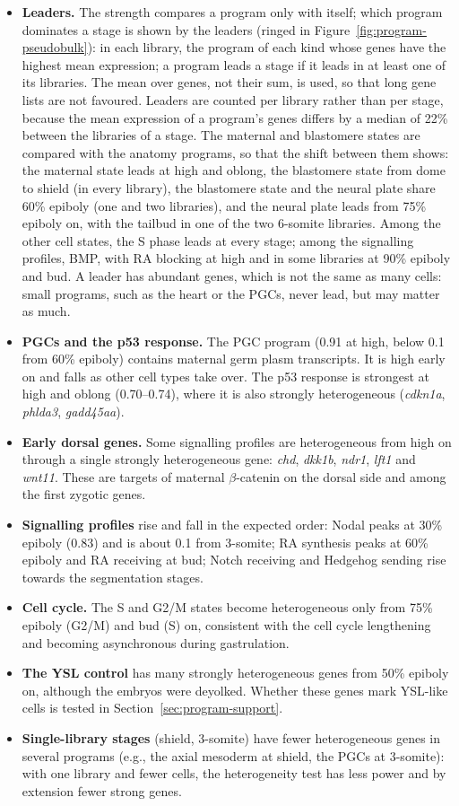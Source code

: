 \documentclass[11pt,a4paper]{article}
\begin{document}
\begin{itemize}
	\item \textbf{Leaders.} The strength compares a program only with itself; which program dominates a stage is shown by the leaders (ringed in Figure~\ref{fig:program-pseudobulk}): in each library, the program of each kind whose genes have the highest mean expression; a program leads a stage if it leads in at least one of its libraries. The mean over genes, not their sum, is used, so that long gene lists are not favoured. Leaders are counted per library rather than per stage, because the mean expression of a program's genes differs by a median of 22\% between the libraries of a stage. The maternal and blastomere states are compared with the anatomy programs, so that the shift between them shows: the maternal state leads at high and oblong, the blastomere state from dome to shield (in every library), the blastomere state and the neural plate share 60\% epiboly (one and two libraries), and the neural plate leads from 75\% epiboly on, with the tailbud in one of the two 6-somite libraries. Among the other cell states, the S phase leads at every stage; among the signalling profiles, BMP, with RA blocking at high and in some libraries at 90\% epiboly and bud. A leader has abundant genes, which is not the same as many cells: small programs, such as the heart or the PGCs, never lead, but may matter as much.
	\item \textbf{PGCs and the p53 response.} The PGC program (0.91 at high, below 0.1 from 60\% epiboly) contains maternal germ plasm transcripts. It is high early on and falls as other cell types take over. The p53 response is strongest at high and oblong (0.70--0.74), where it is also strongly heterogeneous (\emph{cdkn1a}, \emph{phlda3}, \emph{gadd45aa}).
	\item \textbf{Early dorsal genes.} Some signalling profiles are heterogeneous from high on through a single strongly heterogeneous gene: \emph{chd}, \emph{dkk1b}, \emph{ndr1}, \emph{lft1} and \emph{wnt11}. These are targets of maternal $\beta$-catenin on the dorsal side and among the first zygotic genes.
	\item \textbf{Signalling profiles} rise and fall in the expected order: Nodal peaks at 30\% epiboly (0.83) and is about 0.1 from 3-somite; RA synthesis peaks at 60\% epiboly and RA receiving at bud; Notch receiving and Hedgehog sending rise towards the segmentation stages.
	\item \textbf{Cell cycle.} The S and G2/M states become heterogeneous only from 75\% epiboly (G2/M) and bud (S) on, consistent with the cell cycle lengthening and becoming asynchronous during gastrulation.
	\item \textbf{The YSL control} has many strongly heterogeneous genes from 50\% epiboly on, although the embryos were deyolked. Whether these genes mark YSL-like cells is tested in Section~\ref{sec:program-support}.
	\item \textbf{Single-library stages} (shield, 3-somite) have fewer heterogeneous genes in several programs (e.g., the axial mesoderm at shield, the PGCs at 3-somite): with one library and fewer cells, the heterogeneity test has less power and by extension fewer strong genes.
\end{itemize}
\end{document}

